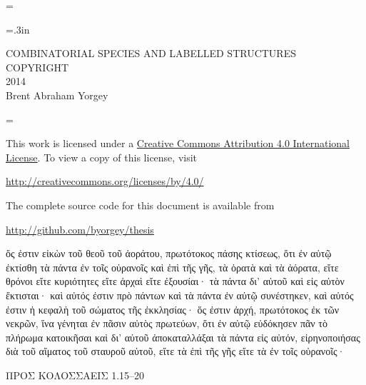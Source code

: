 \documentclass[12pt,oneside]{book}
\newcommand{\Title}{COMBINATORIAL SPECIES AND LABELLED STRUCTURES}
\begin{document}
\normalsize\parskip=\oldparskip

\newpage

\thispagestyle{empty}
\begin{pagecentered}
\doublespaced
\parskip=.3in

\Title \\
COPYRIGHT \\
2014 \\
Brent Abraham Yorgey \bigskip

\singlespaced
\parskip=\oldparskip

This work is licensed under a
\href{http://creativecommons.org/licenses/by/4.0/}{Creative Commons
  Attribution 4.0 International License}.  To view a copy of this
license, visit \bigskip

\url{http://creativecommons.org/licenses/by/4.0/} \bigskip

The complete source code for this document is available from \bigskip

\url{http://github.com/byorgey/thesis}
\end{pagecentered}

\newpage

\begin{pagecentered}

\ifgreek
%



\begingroup
{} \large

ὅς ἐστιν εἰκὼν τοῦ θεοῦ τοῦ ἀοράτου, πρωτότοκος πάσης κτίσεως, ὅτι ἐν
αὐτῷ ἐκτίσθη τὰ πάντα ἐν τοῖς οὐρανοῖς καὶ ἐπὶ τῆς γῆς, τὰ ὁρατὰ καὶ
τὰ ἀόρατα, εἴτε θρόνοι εἴτε κυριότητες εἴτε ἀρχαὶ εἴτε ἐξουσίαι· τὰ
πάντα δι’ αὐτοῦ καὶ εἰς αὐτὸν ἔκτισται· καὶ αὐτός ἐστιν πρὸ πάντων καὶ
τὰ πάντα ἐν αὐτῷ συνέστηκεν, καὶ αὐτός ἐστιν ἡ κεφαλὴ τοῦ σώματος τῆς
ἐκκλησίας· ὅς ἐστιν ἀρχή, πρωτότοκος ἐκ τῶν νεκρῶν, ἵνα γένηται ἐν
πᾶσιν αὐτὸς πρωτεύων, ὅτι ἐν αὐτῷ εὐδόκησεν πᾶν τὸ πλήρωμα κατοικῆσαι
καὶ δι’ αὐτοῦ ἀποκαταλλάξαι τὰ πάντα εἰς αὐτόν, εἰρηνοποιήσας διὰ τοῦ
αἵματος τοῦ σταυροῦ αὐτοῦ, εἴτε τὰ ἐπὶ τῆς γῆς εἴτε τὰ ἐν τοῖς
οὐρανοῖς· \bigskip

\normalsize \hfill ΠΡΟΣ ΚΟΛΟΣΣΑΕΙΣ 1.15--20

\endgroup
\fi

\end{pagecentered}
\end{document}
